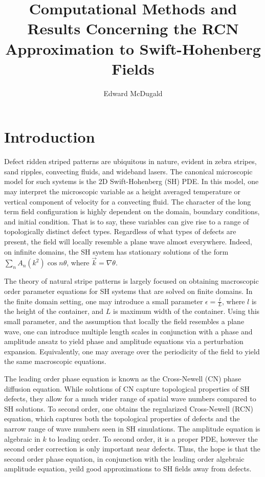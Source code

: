\documentclass[12pt]{article}
\title{Computational Methods and Results Concerning the RCN Approximation to Swift-Hohenberg Fields}
\author{Edward McDugald}
\numberwithin{equation}{section}
\begin{document}
\maketitle

\section{Introduction}
\par Defect ridden striped patterns are ubiquitous in nature, evident in zebra stripes, sand ripples, convecting fluids, and wideband lasers. The canonical microscopic model for such systems is the 2D Swift-Hohenberg (SH) PDE. In this model, one may interpret the microscopic variable as a height averaged temperature or vertical component of velocity for a convecting fluid. The character of the long term field configuration is highly dependent on the domain, boundary conditions, and initial condition. That is to say, these variables can give rise to a range of topologically distinct defect types. Regardless of what types of defects are present, the field will locally resemble a plane wave almost everywhere. Indeed, on infinite domains, the SH system has stationary solutions of the form $\sum_{n}A_n(k^2)\cos{n\theta}$, where $\vec{k} = \nabla \theta$. 
\par The theory of natural stripe patterns is largely focused on obtaining macroscopic order parameter equations for SH systems that are solved on finite domains. In the finite domain setting, one may introduce a small parameter $\epsilon = \frac{l}{L}$, where $l$ is the height of the container, and $L$ is maximum width of the container. Using this small parameter, and the assumption that locally the field resembles a plane wave, one can introduce multiple length scales in conjunction with a phase and amplitude ansatz to yield phase and amplitude equations via a perturbation expansion. Equivalently, one may average over the periodicity of the field to yield the same macroscopic equations.
\par The leading order phase equation is known as the Cross-Newell (CN) phase diffusion equation. While solutions of CN capture topological properties of SH defects, they allow for a much wider range of spatial wave numbers compared to SH solutions. To second order, one obtains the regularized Cross-Newell (RCN) equation, which captures both the topological properties of defects and the narrow range of wave numbers seen in SH simulations. The amplitude equation is algebraic in $k$ to leading order. To second order, it is a proper PDE, however the second order correction is only important near defects. Thus, the hope is that the second order phase equation, in conjunction with the leading order algebraic amplitude equation, yeild good approximations to SH fields away from defects.
\end{document}
